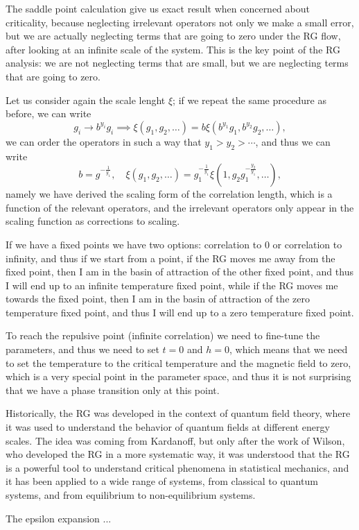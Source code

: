 The saddle point calculation give us exact result when concerned about criticality, because neglecting irrelevant operators not only we make a small error, but we are actually neglecting terms that are going to zero under the RG flow, after looking at an infinite scale of the system. This is the key point of the RG analysis: we are not neglecting terms that are small, but we are neglecting terms that are going to zero.

Let us consider again the scale lenght \(\xi\); if we repeat the same procedure as before, we can write
\[
    g_i \to b^{y_i} g_i \implies \xi(g_1, g_2, \dots) = b \xi(b^{y_1} g_1, b^{y_2} g_2, \dots),
\]
we can order the operators in such a way that \(y_1 > y_2 > \cdots\), and thus we can write
\[
    b = g^{-\tfrac{1}{y_1}}, \quad \xi(g_1, g_2, \dots) = g_1^{-\tfrac{1}{y_1}} \xi(1, g_2 g_1^{-\tfrac{y_2}{y_1}}, \dots),
\]
namely we have derived the scaling form of the correlation length, which is a function of the relevant operators, and the irrelevant operators only appear in the scaling function as corrections to scaling.

If we have a fixed points we have two options: correlation to 0 or correlation to infinity, and thus if we start from a point, if the RG moves me away from the fixed point, then I am in the basin of attraction of the other fixed point, and thus I will end up to an infinite temperature fixed point, while if the RG moves me towards the fixed point, then I am in the basin of attraction of the zero temperature fixed point, and thus I will end up to a zero temperature fixed point.

To reach the repulsive point (infinite correlation) we need to fine-tune the parameters, and thus we need to set \(t = 0\) and \(h = 0\), which means that we need to set the temperature to the critical temperature and the magnetic field to zero, which is a very special point in the parameter space, and thus it is not surprising that we have a phase transition only at this point.


Historically, the RG was developed in the context of quantum field theory, where it was used to understand the behavior of quantum fields at different energy scales. The idea was coming from Kardanoff, but only after the work of Wilson, who developed the RG in a more systematic way, it was understood that the RG is a powerful tool to understand critical phenomena in statistical mechanics, and it has been applied to a wide range of systems, from classical to quantum systems, and from equilibrium to non-equilibrium systems.

The epsilon expansion ...